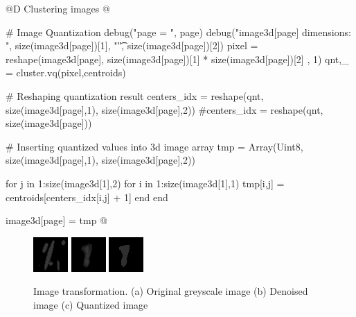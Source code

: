 \documentclass[11pt,oneside]{article}	%
\begin{document}
@D Clustering images
@{# Image Quantization
debug("page = ", page)
debug("image3d[page] dimensions: ", size(image3d[page])[1], "\t", size(image3d[page])[2])
pixel = reshape(image3d[page], size(image3d[page])[1] * size(image3d[page])[2] , 1)
qnt,_ = cluster.vq(pixel,centroids)

# Reshaping quantization result
centers_idx = reshape(qnt, size(image3d[page],1), size(image3d[page],2))
#centers_idx = reshape(qnt, size(image3d[page]))

# Inserting quantized values into 3d image array
tmp = Array(Uint8, size(image3d[page],1), size(image3d[page],2))

for j in 1:size(image3d[1],2)
  for i in 1:size(image3d[1],1)
    tmp[i,j] = centroids[centers_idx[i,j] + 1]
  end
end

image3d[page] = tmp @}

\begin{figure}[htb] %
   \centering
   \includegraphics[width=0.30\linewidth]{images/grayscalesample.png} \hfill
   \includegraphics[width=0.30\linewidth]{images/denoised.png} \hfill
   \includegraphics[width=0.30\linewidth]{images/quantized.png} \hfill
   \caption{Image transformation. (a) Original greyscale image (b) Denoised image (c) Quantized image}
   \label{fig:rawImage}
\end{figure}
\end{document}
